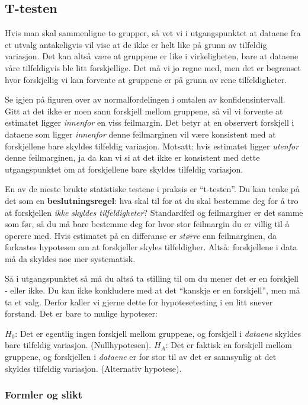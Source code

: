 \documentclass[
  norsk,
  letterpaper,
  DIV=11,
  numbers=noendperiod]{scrreprt}
\theoremstyle{definition}
\theoremstyle{remark}
\begin{document}
\subsection{T-testen}\label{t-testen}

Hvis man skal sammenligne to grupper, så vet vi i utgangspunktet at
dataene fra et utvalg antakeligvis vil vise at de ikke er helt like på
grunn av tilfeldig variasjon. Det kan altså være at gruppene er like i
virkeligheten, bare at dataene våre tilfeldigvis ble litt forskjellige.
Det må vi jo regne med, men det er begrenset hvor forskjellig vi kan
forvente at gruppene er på grunn av rene tilfeldigheter.

Se igjen på figuren over av normalfordelingen i omtalen av
konfidensintervall. Gitt at det ikke er noen sann forskjell mellom
gruppene, så vil vi forvente at estimatet ligger \emph{innenfor} en viss
feilmargin. Det betyr at en observert forskjell i dataene som ligger
\emph{innenfor} denne feilmarginen vil være konsistent med at
forskjellene bare skyldes tilfeldig variasjon. Motsatt: hvis estimatet
ligger \emph{utenfor} denne feilmarginen, ja da kan vi si at det ikke er
konsistent med dette utgangspunktet om at forskjellene bare skyldes
tilfeldig variasjon.

En av de meste brukte statistiske testene i praksis er ``t-testen''. Du
kan tenke på det som en \textbf{beslutningsregel}: hva skal til for at
du skal bestemme deg for å tro at forskjellen \emph{ikke skyldes
tilfeldigheter}? Standardfeil og feilmarginer er det samme som før, så
du må bare bestemme deg for hvor stor feilmargin du er villig til å
operere med. Hvis estimatet på en differanse er \emph{større} enn
feilmarginen, da forkastes hypotesen om at forskjeller skyles
tilfeldigher. Altså: forskjellene i data må da skyldes noe mer
systematisk.

Så i utgangspunktet så må du altså ta stilling til om du mener det er en
forskjell - eller ikke. Du kan ikke konkludere med at det ``kanskje er
en forskjell'', men må ta et valg. Derfor kaller vi gjerne dette for
hypotesetesting i en litt snever forstand. Det er bare to mulige
hypoteser:

\(H_0\): Det er egentlig ingen forskjell mellom gruppene, og forskjell i
\emph{dataene} skyldes bare tilfeldig variasjon. (Nullhypotesen).
\(H_A\): Det er faktisk en forskjell mellom gruppene, og forskjellen i
\emph{dataene} er for stor til av det er sannsynlig at det skyldes
tilfeldig variasjon. (Alternativ hypotese).

\subsubsection{Formler og slikt}\label{formler-og-slikt}
\end{document}
